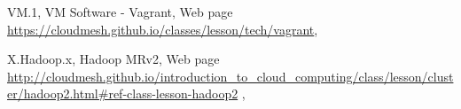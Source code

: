 
VM.1, VM Software - Vagrant, Web page
\url{https://cloudmesh.github.io/classes/lesson/tech/vagrant}, 

X.Hadoop.x, Hadoop MRv2, Web page \url{http://cloudmesh.github.io/introduction_to_cloud_computing/class/lesson/cluster/hadoop2.html#ref-class-lesson-hadoop2} ,


